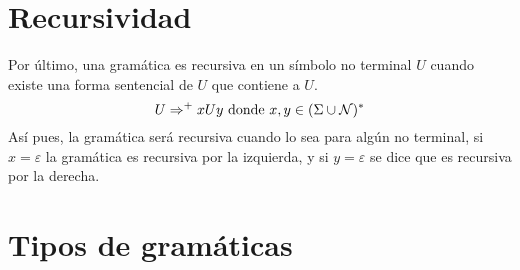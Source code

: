 \section{Recursividad}

Por último, una gramática es recursiva en un símbolo no terminal $U$ cuando existe una forma sentencial de $U$ que contiene a $U$. \[U \Rightarrow^{+}xUy \textup{ donde } x,y\in (\Sigma \cup \mathcal{N})^{*} \]
Así pues, la gramática será recursiva cuando lo sea para algún no terminal, si $x = \varepsilon$ la gramática es recursiva por la izquierda, y si $y = \varepsilon$ se dice que es recursiva por la derecha.

\section{Tipos de gramáticas }

